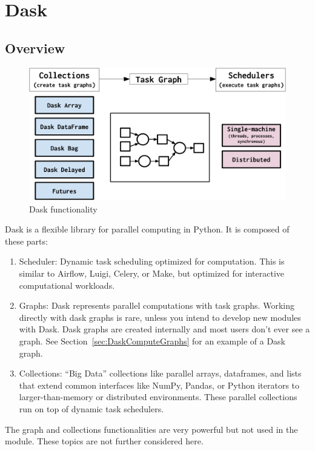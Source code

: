 

\chapter{Dask}
\label{chap:Dask}

\section{Overview}
\label{sec:DaskOverview}


\begin{figure}[htbp]
    \centering
\includegraphics[width=.75\textwidth]{pic/dask-overview}
    \caption{Dask functionality \cite{daskhomepage2020}}
    \label{fig:dask-overview}
\end{figure}



Dask \cite{daskhomepage2020} is a flexible library for parallel computing in Python.
It is composed of these parts:
\begin{enumerate}
\item Scheduler: Dynamic task scheduling optimized for computation. This is similar to Airflow, Luigi, Celery, or Make, but optimized for interactive computational workloads.
\item Graphs: Dask represents parallel computations with task graphs.  Working directly with dask graphs is rare, unless you intend to develop new modules with Dask. Dask graphs are created internally and most users don't ever see a graph. See Section~\ref{sec:DaskComputeGraphs} for an example of a Dask graph.
\item Collections: ``Big Data'' collections like parallel arrays, dataframes, and lists that extend common interfaces like NumPy, Pandas, or Python iterators to larger-than-memory or distributed environments. These parallel collections run on top of dynamic task schedulers.
\end{enumerate}

The graph and collections functionalities are very powerful but not used in the \libradtrandask{} module. These topics are not further considered here.


